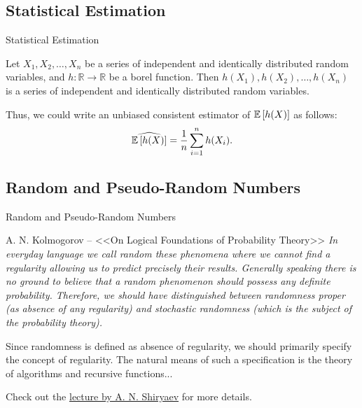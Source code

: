 \subsection{Statistical Estimation}
    \begin{frame}{Statistical Estimation}
        \begin{lemma}
            Let $X_1, X_2, \dots, X_n$ be a series of independent and identically distributed random variables, and $h: \mathbb{R} \to \mathbb{R}$ be a borel function. Then $h(X_1), h(X_2), \dots, h(X_n)$ is a series of independent and identically distributed random variables.
        \end{lemma}
        Thus, we could write an unbiased consistent estimator of $\mathbb{E} \left[h(X)\right]$ as follows:
        \begin{equation}
            \widehat{\mathbb{E} \left[h(X)\right]} = \frac{1}{n} \sum_{i=1}^n h(X_i).
        \end{equation}
    \end{frame}

\subsection{Random and Pseudo-Random Numbers}
    \begin{frame}{Random and Pseudo-Random Numbers}
        \begin{block}{A. N. Kolmogorov -- <<On Logical Foundations of Probability Theory>>}
            \it In everyday language we call random these phenomena where we cannot find a regularity allowing us to predict precisely their results. Generally speaking there is no ground to believe that a random phenomenon should possess any definite probability. Therefore, we should have distinguished between randomness proper
            (as absence of any regularity) and stochastic randomness (which is the subject of the probability theory).

            Since randomness is defined as absence of regularity, we should
            primarily specify the concept of regularity. The natural means of such a specification is the theory of algorithms and recursive functions...
        \end{block}
        Check out the \href{https://youtu.be/qKVoFqp1DzA}{lecture by A. N. Shiryaev} for more details.
    \end{frame}

